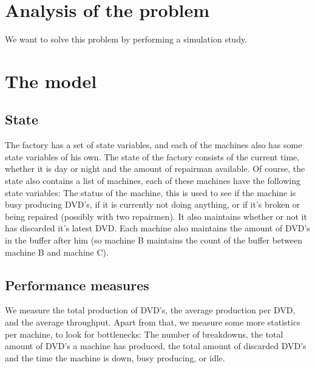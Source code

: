 \documentclass{article}
\begin{document}
\section{Analysis of the problem}
We want to solve this problem by performing a simulation study. %


\section{The model}
\subsection{State}
The factory has a set of state variables, and each of the machines also has some state variables of his own.
The state of the factory consists of the current time, whether it is day or night and the amount of repairman available.
Of course, the state also contains a list of machines, each of these machines have the following state variables:
The status of the machine, this is used to see if the machine is busy producing DVD's, if it is currently not doing anything, or if it's broken or being repaired (possibly with two repairmen).
It also maintains whether or not it has discarded it's latest DVD\@.
Each machine also maintains the amount of DVD's in the buffer after him (so machine B maintains the count of the buffer between machine B and machine C).

\subsection{Performance measures}
\label{performance_measures}
We measure the total production of DVD's, the average production per DVD,
and the average throughput.
Apart from that, we measure some more statistics per machine, to look for bottlenecks:
The number of breakdowns, the total amount of DVD's a machine has produced,
the total amount of discarded DVD's and the time the machine is down, busy producing, or idle.
\end{document}
